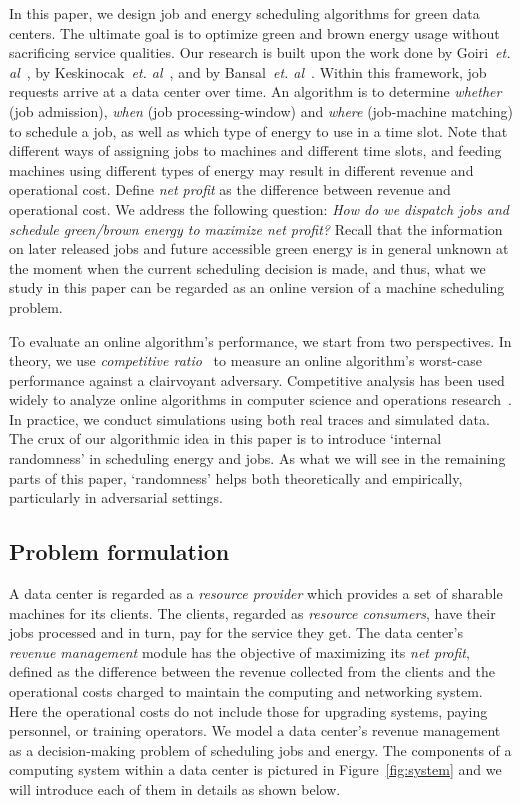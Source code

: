 \documentclass[conference]{IEEEtran}
\begin{document}
In this paper, we design job and energy scheduling algorithms for green data centers. The ultimate goal is to optimize green and brown energy usage without sacrificing service qualities. Our research is built upon the work done by Goiri~\emph{et. al}~\cite{GoiriL11}, by Keskinocak~\emph{et. al}~\cite{KeskinocakRT01}, and by Bansal~\emph{et. al}~\cite{BansalCP11}. Within this framework, job requests arrive at a data center over time. An algorithm is to determine \emph{whether} (job admission), \emph{when} (job processing-window) and \emph{where} (job-machine matching) to schedule a job, as well as which type of energy to use in a time slot.  Note that different ways of assigning jobs to machines and different time slots, and feeding machines using different types of energy may result in different revenue and operational cost. Define \emph{net profit} as the difference between revenue and operational cost. We address the following question: \emph{How do we dispatch jobs and schedule green/brown energy to maximize net profit?} Recall that the information on later released jobs and future accessible green energy is in general unknown at the moment when the current scheduling decision is made, and thus, what we study in this paper can be regarded as an online version of a machine scheduling problem.

To evaluate an online algorithm's performance, we start from two perspectives. In theory, we use \emph{competitive ratio}~\cite{BorodinE98} to measure an online algorithm's worst-case performance against a clairvoyant adversary. Competitive analysis has been used widely to analyze online algorithms in computer science and operations research~\cite{BorodinE98}. In practice, we conduct simulations using both real traces and simulated data. The crux of our algorithmic idea in this paper is to introduce `internal randomness' in scheduling energy and jobs. As what we will see in the remaining parts of this paper, `randomness' helps both theoretically and empirically, particularly in adversarial settings.



\subsection{Problem formulation}

A data center is regarded as a \emph{resource provider} which provides a set of sharable machines for its clients. The clients, regarded as \emph{resource consumers}, have their jobs processed and in turn, pay for the service they get. The data center's \emph{revenue management} module has the objective of maximizing its \emph{net profit}, defined as the difference between the revenue collected from the clients and the operational costs charged to maintain the computing and networking system. Here the operational costs do not include those for upgrading systems, paying personnel, or training operators. We model a data center's revenue management as a decision-making problem of scheduling jobs and energy. The components of a computing system within a data center is pictured in Figure~\ref{fig:system} and we will introduce each of them in details as shown below.
\end{document}
